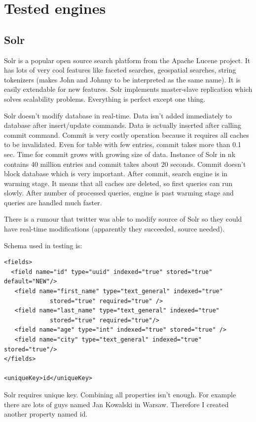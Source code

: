 \documentclass[10pt,a4paper]{article}
\begin{document}
\section{Tested engines}
\subsection{Solr}

Solr is a popular open source search platform from the Apache Lucene project. It has lots of very cool features like faceted searches, geospatial searches, string tokenizers (makes John and Johnny to be interpreted as the same name). It is easily extendable for new features. Solr implements master-slave replication which solves scalability problems. Everything is perfect except one thing. 

Solr doesn't modify database in real-time. Data isn't added immediately to database after insert/update commands. Data is actually inserted after calling commit command. Commit is very costly operation because it requires all caches to be invalidated. Even for table with few entries, commit takes more than 0.1 sec. Time for commit grows with growing size of data. Instance of Solr in nk contains 40 million entries and commit takes about 20 seconds. Commit doesn't block database which is very important. After commit, search engine is in warming stage. It means that all caches are deleted, so first queries can run slowly. After number of processed queries, engine is past warming stage and queries are handled much faster.

There is a rumour that twitter was able to modify source of Solr so they could have real-time modifications (apparently they succeeded, source needed).

Schema used in testing is:

\begin{lstlisting}
<fields>
  <field name="id" type="uuid" indexed="true" stored="true" default="NEW"/>
   <field name="first_name" type="text_general" indexed="true"
             stored="true" required="true" /> 
   <field name="last_name" type="text_general" indexed="true" 
             stored="true" required="true"/>
   <field name="age" type="int" indexed="true" stored="true" /> 
   <field name="city" type="text_general" indexed="true" stored="true"/>
</fields>

<uniqueKey>id</uniqueKey> 
\end{lstlisting}

Solr requires unique key. Combining all properties isn't enough. For example there are lots of guys named Jan Kowalski in Warsaw. Therefore I created another property named id.
\end{document}
